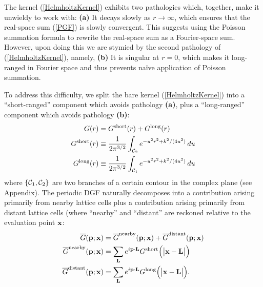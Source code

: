 \documentclass[letterpaper]{article}
\newcommand{\GB}{\overline{G}}
\begin{document}
The kernel (\ref{HelmholtzKernel}) exhibits two pathologies
which, together, make it unwieldy to work with:
\textbf{(a)} It decays slowly as $r\to\infty$, which 
ensures that the real-space sum (\ref{PGF}) is slowly 
convergent. This suggests using the Poisson summation
formula to rewrite the real-space sum as a Fourier-space
sum.
However, upon doing this we are stymied by the 
second pathology of (\ref{HelmholtzKernel}), namely,
\textbf{(b)} It is singular at $r=0$, which makes it 
long-ranged in Fourier space and thus prevents na\"ive 
application of Poisson summation.

To address this difficulty, we split the bare kernel (\ref{HelmholtzKernel}) 
into a ``short-ranged'' component which avoids 
pathology \textbf{(a)}, plus a ``long-ranged'' component
which avoids pathology \textbf{(b)}:
\begin{align}
G(r)
&= G^{\hbox{\scriptsize{short}}}(r) + G^{\hbox{\scriptsize{long}}}(r)
\\
 G^{\hbox{\scriptsize{short}}}(r)
&\equiv
 \frac{1}{2\pi^{3/2}} \int_{\mathcal{C}_2}
  e^{ -u^2 r^2 + k^2/(4u^2)} \, du
\label{GShort}
\\
 G^{\hbox{\scriptsize{long}}}(r)
&\equiv
 \frac{1}{2\pi^{3/2}} \int_{\mathcal{C}_1}
  e^{ -u^2 r^2 + k^2/(4u^2)} \, du
\label{GLong}
\end{align}
where $\{\mathcal{C}_1,\mathcal{C}_2\}$ are two branches of 
a certain contour in the complex plane (see Appendix).
The periodic DGF naturally decomposes into a contribution
arising primarily from nearby lattice cells plus a contribution
arising primarily from distant lattice cells
(where ``nearby'' and ``distant'' are reckoned relative to
the evaluation point $\mathbf{x}$:
\begin{align}
\GB(\vb p; \vb x) 
&=\GB\sups{nearby}(\vb p; \vb x) + \GB\sups{distant}(\vb p; \vb x)
\label{GBDecomposition} \\
\GB\sups{nearby}(\vb p; \vb x) 
 &= \sum_{\vb L} e^{i\vb p \cdot \vb L} 
    G\sups{short}\Big( \big |\vb x-\vb L \big| \Big)
\label{GNearby} \\
\GB\sups{distant}(\vb p; \vb x) 
 &= \sum_{\vb L} e^{i\vb p \cdot \vb L} 
    G\sups{long}\Big( \big |\vb x-\vb L \big| \Big).
\label{GDistant}
\end{align}
\end{document}
